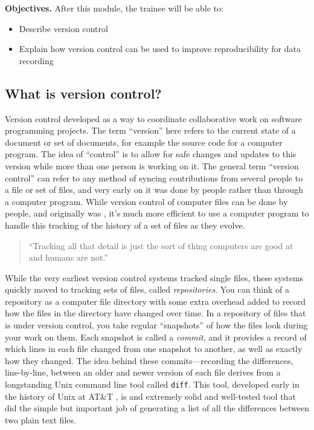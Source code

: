 \documentclass[]{tufte-book}
\providecommand{\tightlist}{%
  \setlength{\itemsep}{0pt}\setlength{\parskip}{0pt}}
\begin{document}
\textbf{Objectives.} After this module, the trainee will be able to:

\begin{itemize}
\tightlist
\item
  Describe version control\\
\item
  Explain how version control can be used to improve reproducibility
  for data recording
\end{itemize}

\hypertarget{what-is-version-control}{%
\subsection{What is version control?}\label{what-is-version-control}}

Version control developed as a way to coordinate collaborative work on software
programming projects. The term ``version'' here refers to the current state of a
document or set of documents, for example the source code for a computer
program. The idea of ``control'' is to allow for safe changes and updates to this
version while more than one person is working on it. The general term ``version
control'' can refer to any method of syncing contributions from several people to
a file or set of files, and very early on it was done by people rather than
through a computer program. While version control of computer files can be done
by people, and originally was \citep{irving2011astonishments}, it's much more
efficient to use a computer program to handle this tracking of the history of a
set of files as they evolve.

\begin{quote}
``Tracking all that detail is just the sort of thing computers
are good at and humans are not.'' \citep{raymond2003art}
\end{quote}

While the very earliest version control systems tracked single files, these
systems quickly moved to tracking sets of files, called \emph{repositories}. You can
think of a repository as a computer file directory with some extra overhead
added to record how the files in the directory have changed over time. In a
repository of files that is under version control, you take regular ``snapshots''
of how the files look during your work on them. Each snapshot is called a
\emph{commit}, and it provides a record of which lines in each file changed from one
snapshot to another, as well as exactly how they changed. The idea behind these
commits---recording the differences, line-by-line, between an older and newer
version of each file derives from a longstanding Unix command line tool called
\texttt{diff}. This tool, developed early in the history of Unix at AT\&T
\citep{raymond2003art}, is and extremely solid and well-tested tool that did the
simple but important job of generating a list of all the differences between two
plain text files.
\end{document}
